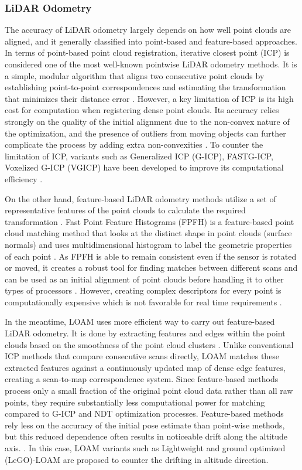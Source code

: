 \documentclass[12pt, a4paper]{article}
\begin{document}
\subsubsection{LiDAR Odometry} 
The accuracy of LiDAR odometry largely depends on how well point clouds are
aligned, and it generally classified into point-based and feature-based
approaches. In terms of point-based point cloud registration, iterative closest
point (ICP) is considered one of the most well-known pointwise LiDAR odometry
methods. It is a simple, modular algorithm that aligns two consecutive point
clouds by establishing point-to-point correspondences and estimating the
transformation that minimizes their distance error \cite{besl1992method}.
However, a key limitation of ICP is its high cost for computation when registering
dense point clouds. Its accuracy relies strongly on the quality of the initial
alignment due to the non-convex nature of the optimization, and the presence of
outliers from moving objects can further complicate the process by adding extra
non-convexities \cite{maron2016point}. To counter the limitation of ICP, variants
such as Generalized ICP (G-ICP), FASTG-ICP, Voxelized G-ICP (VGICP) have been
developed to improve its computational efficiency \cite{segal2009generalized,
huang2022point}. 

On the other hand, feature-based LiDAR odometry methods utilize a set of
representative features of the point clouds to calculate the required
transformation \cite{rusu2009fast, salti2014shot}. Fast Point Feature Histograms
(FPFH) is a feature-based point cloud matching method that looks at the distinct
shape in point clouds (surface normals) and uses multidimensional histogram to
label the geometric properties of each point \cite{rusu2009fast}. As FPFH is
able to remain consistent even if the sensor is rotated or moved, it creates a
robust tool for finding matches between different scans and can be used as an
initial alignment of point clouds before handling it to other types of
processors \cite{wu2020iterative}. However, creating complex descriptors for
every point is computationally expensive which is not favorable for real time
requirements \cite{doi:10.3233/AIC-230217}. 

In the meantime, LOAM uses more efficient way to carry out feature-based LiDAR
odometry. It is done by extracting features and edges within the point clouds
based on the smoothness of the point cloud clusters \cite{huang2022point}.
Unlike conventional ICP methods that compare consecutive scans directly, LOAM
matches these extracted features against a continuously updated map of dense
edge features, creating a scan-to-map correspondence system. Since feature-based
methods process only a small fraction of the original point cloud data rather
than all raw points, they require substantially less computational power for
matching compared to G-ICP and NDT optimization processes. Feature-based methods
rely less on the accuracy of the initial pose estimate than point-wise methods,
but this reduced dependence often results in noticeable drift along the altitude
axis. \cite{koide2021voxelized, shan2018lego}. In this case, LOAM variants such
as Lightweight and ground optimized (LeGO)-LOAM \cite{shan2018lego} are proposed
to counter the drifting in altitude direction.
\end{document}
